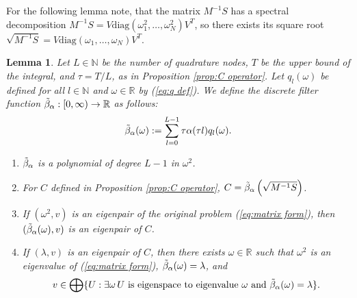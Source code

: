 \documentclass[a4paper,11pt,bibliography=totoc,listof=totoc,headinclude=true,cleardoublepage=empty,oneside]{scrbook}
\newtheorem{lemma}[theorem]{Lemma}
\newcommand{\R}{\mathbb{R}}
\newcommand{\N}{\mathbb{N}}
\newcommand{\dff}{\Tilde{\beta}_\alpha}
\renewcommand{\eqref}[1]{(\ref{#1})}
\begin{document}
For the following lemma note, that the matrix $M^{-1}S$ has a spectral decomposition $M^{-1}S = V\mathrm{diag}(\omega_1^2, \dots, \omega_N^2)V^T$, so there exists its square root $\sqrt{M^{-1}S} = V\mathrm{diag}(\omega_1, \dots, \omega_N)V^T$. 

\begin{lemma}\label{lemma:dff}
    Let $L\in \N$ be the number of quadrature nodes, $T$ be the upper bound of the integral, and $\tau = T/L$, as in Proposition \ref{prop:C operator}. Let $q_l(\omega)$ be defined for all $l \in \N$ and $\omega \in \R$ by \eqref{eq:q def}. We define the discrete filter function $\dff: [0, \infty) \rightarrow \R$ as follows:
    \begin{equation}\label{eq:dff}
        \dff(\omega) := \sum_{l=0}^{L-1} \tau \alpha(\tau l) q_l(\omega).
    \end{equation}
    \begin{enumerate}
        \item $\dff$ is a polynomial of degree $L-1$ in $\omega^2$.
        \item For $C$ defined in Proposition \ref{prop:C operator}, $C = \dff\left(\sqrt{M^{-1}S}\right)$.
        \item If $(\omega^2, v)$ is an eigenpair of the original problem \eqref{eq:matrix form}, then $(\dff(\omega), v)$ is an eigenpair of $C$.
        \item If $(\lambda, v)$ is an eigenpair of $C$, then there exists $\omega \in \R$ such that $\omega^2$ is an eigenvalue of \eqref{eq:matrix form}, $\dff(\omega)=\lambda$, and
        \begin{equation*}
            v \in \bigoplus\{ U : \exists \omega \, U \text{ is eigenspace to eigenvalue } \omega \text{ and } \dff(\omega) = \lambda\}.
        \end{equation*}
    \end{enumerate}
\end{lemma}
\end{document}
